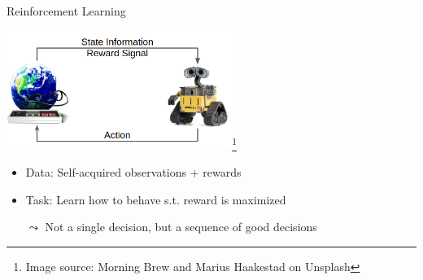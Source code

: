 \documentclass[aspectratio=169]{../latex_main/tntbeamer}  %
\begin{document}
\begin{frame}[c]{Reinforcement Learning}
	
	\centering
	\includegraphics[width=0.55\textwidth]{images/rl_comic.png}\footnote{Image source: Morning Brew and Marius Haakestad on Unsplash}
	
	\bigskip
	
	\begin{itemize}
		\item Data: Self-acquired observations + rewards
		\item Task: Learn how to behave s.t. reward is maximized
		\item[$\leadsto$] Not a single decision, but a sequence of good decisions
	\end{itemize}	
	
	
\end{frame}
\end{document}
